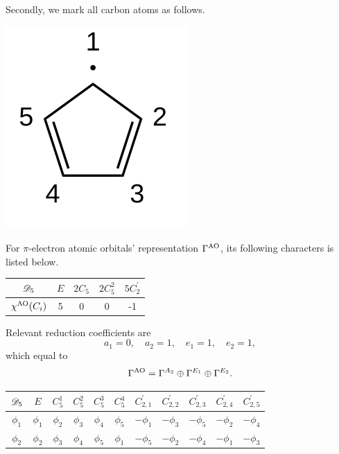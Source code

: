 \documentclass[a4paper]{book}
\newcommand{\AO}{{\rm AO}}
\begin{document}
\begin{solution}
\begin{enumerate}[label=(\alph*)]
		Secondly, we mark all carbon atoms as follows.
		\begin{center}
		\includegraphics[scale=1.0]{./structures/exercise_1/cyclopentadienyl_radical/0.png}
		\setlength{\abovecaptionskip}{-0.3em}
		\setlength{\belowcaptionskip}{-0.8em}
		\end{center}				

		For $\pi$-electron atomic orbitals' representation $\Gamma^{\rm AO}$, its following characters is listed below.
		\begin{center}
		\setlength{\abovecaptionskip}{-0.3em}
		\begin{tabular}{ccccc}\hline
	$\mathscr{D}_{\rm 5}$	& $E$ & $2C_5$ &	$2C^2_5$	& $5C^\prime_2$ \\ \hline
	$\chi^{\AO}(C_i)$	&	5	&	0	&	0	&	-1	\\ \hline
		\end{tabular}\vspace*{-0.5em}
		\end{center}
		Relevant reduction coefficients are
		\begin{equation*}
		a_1 = 0, \quad a_2 = 1, \quad e_1 = 1, \quad e_2 = 1,
		\end{equation*}
		which equal to
		\begin{equation*}
			\Gamma^{\AO} = \Gamma^{A_2} \oplus \Gamma^{E_1} \oplus \Gamma^{E_2}.
		\end{equation*}
		
		\begin{center}
		\begin{tabular}{ccccccccccc}\hline
	$\mathscr{D}_{\rm 5}$ & $E$ & $C^1_5$ & $C^2_5$ & $C^3_5$	&	$C^4_5$	&	$C^\prime_{2,1}$	&	$C^\prime_{2,2}$ &	$C^\prime_{2,3}$	&	$C^\prime_{2,4}$	&	$C^\prime_{2,5}$	\\ \hline
			$\phi_1$	&	$\phi_1$	&	$\phi_2$	&	$\phi_3$	&	$\phi_4$	&	$\phi_5$	&	$-\phi_1$	&	$-\phi_3$	&	$-\phi_5$	&	$-\phi_2$	&	$-\phi_4$	\\
			$\phi_2$	&	$\phi_2$	&	$\phi_3$	&	$\phi_4$	&	$\phi_5$	&	$\phi_1$	&	$-\phi_5$	&	$-\phi_2$	&	$-\phi_4$	&	$-\phi_1$	&	$-\phi_3$	\\ \hline
		\end{tabular}
		\end{center}
		

\end{enumerate}
\end{solution}
\end{document}
